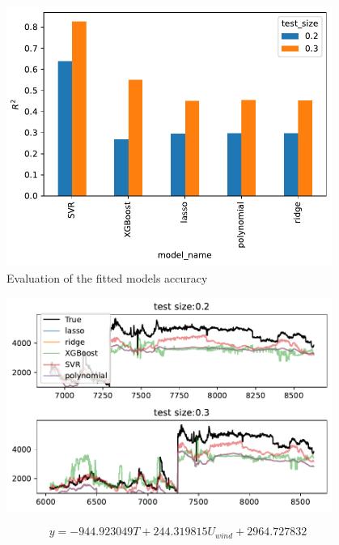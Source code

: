 \begin{figure}[H]
\begin{center}\includegraphics[width = 0.95\textwidth]{figures/test_evaluation.pdf}\end{center}
\vspace{-0.7cm}
\caption{Evaluation of the fitted models accuracy}
\label{fig:test_evaluation}
\end{figure}
\begin{figure}[H]
\begin{center}\includegraphics[width = 0.95\textwidth]{figures/output_43_0.pdf}\end{center}
\vspace{-0.7cm}
\caption{}
\label{fig:}
\end{figure}
\begin{equation}
y = - 944.923049 T + 244.319815 U_{wind} + 2964.727832
\label{eq:model_polynomial}
\end{equation}

